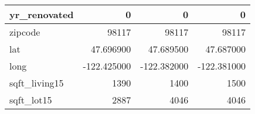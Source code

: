 \begin{table}[H]
\begin{tabular}{|l|r|r|r|}
\hline yr\_renovated & \cellcolor[rgb]{0.9, 0.54, 0.52} 0 & \cellcolor[rgb]{0.9, 0.54, 0.52} 0 & \cellcolor[rgb]{0.9, 0.54, 0.52} 0 \\
\hline zipcode & \cellcolor[rgb]{0.9, 0.54, 0.52} 98117 & \cellcolor[rgb]{0.9, 0.54, 0.52} 98117 & \cellcolor[rgb]{0.9, 0.54, 0.52} 98117 \\
\hline lat & \cellcolor[rgb]{0.9, 0.54, 0.52} 47.696900 & 47.689500 & 47.687000 \\
\hline long & \cellcolor[rgb]{0.9, 0.54, 0.52} -122.425000 & \cellcolor[rgb]{0.9, 0.54, 0.52} -122.382000 & \cellcolor[rgb]{0.9, 0.54, 0.52} -122.381000 \\
\hline sqft\_living15 & \cellcolor[rgb]{0.9, 0.54, 0.52} 1390 & 1400 & 1500 \\
\hline sqft\_lot15 & \cellcolor[rgb]{0.9, 0.54, 0.52} 2887 & 4046 & 4046 \\
\hline
\end{tabular}
\end{table}
